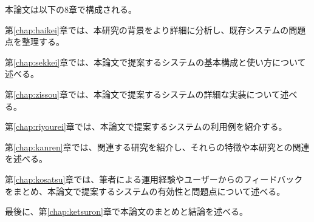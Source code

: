 本論文は以下の8章で構成される。

第\ref{chap:haikei}章では、本研究の背景をより詳細に分析し、既存システムの問題点を整理する。

第\ref{chap:sekkei}章では、本論文で提案するシステムの基本構成と使い方について述べる。

第\ref{chap:zissou}章では、本論文で提案するシステムの詳細な実装について述べる。

第\ref{chap:riyourei}章では、本論文で提案するシステムの利用例を紹介する。

第\ref{chap:kanren}章では、関連する研究を紹介し、それらの特徴や本研究との関連を述べる。

第\ref{chap:kosatsu}章では、筆者による運用経験やユーザーからのフィードバックをまとめ、本論文で提案するシステムの有効性と問題点について述べる。

最後に、第\ref{chap:ketsuron}章で本論文のまとめと結論を述べる。